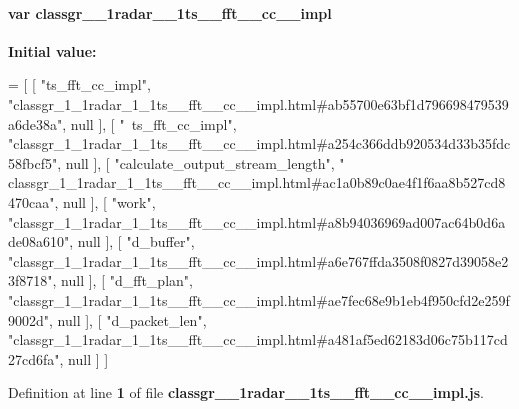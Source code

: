 \paragraph[{classgr\+\_\+1\+\_\+1radar\+\_\+1\+\_\+1ts\+\_\+\+\_\+fft\+\_\+\+\_\+cc\+\_\+\+\_\+impl}]{\setlength{\rightskip}{0pt plus 5cm}var classgr\+\_\+\_\+1radar\+\_\+\_\+1ts\+\_\+\+\_\+fft\+\_\+\+\_\+cc\+\_\+\+\_\+impl}\label{classgr__1__1radar__1__1ts____fft____cc____impl_8js_ab011e260c65eb74fa6d81d3e65b93fee}
{\bfseries Initial value\+:}
\begin{DoxyCode}
=
[
    [ \textcolor{stringliteral}{"ts\_fft\_cc\_impl"}, \textcolor{stringliteral}{"classgr\_1\_1radar\_1\_1ts\_\_fft\_\_cc\_\_impl.html#ab55700e63bf1d796698479539a6de38a"}, 
      null ],
    [ \textcolor{stringliteral}{"~ts\_fft\_cc\_impl"}, \textcolor{stringliteral}{"classgr\_1\_1radar\_1\_1ts\_\_fft\_\_cc\_\_impl.html#a254c366ddb920534d33b35fdc58fbcf5"}, 
      null ],
    [ \textcolor{stringliteral}{"calculate\_output\_stream\_length"}, \textcolor{stringliteral}{"
      classgr\_1\_1radar\_1\_1ts\_\_fft\_\_cc\_\_impl.html#ac1a0b89c0ae4f1f6aa8b527cd8470caa"}, null ],
    [ \textcolor{stringliteral}{"work"}, \textcolor{stringliteral}{"classgr\_1\_1radar\_1\_1ts\_\_fft\_\_cc\_\_impl.html#a8b94036969ad007ac64b0d6ade08a610"}, null ],
    [ \textcolor{stringliteral}{"d\_buffer"}, \textcolor{stringliteral}{"classgr\_1\_1radar\_1\_1ts\_\_fft\_\_cc\_\_impl.html#a6e767ffda3508f0827d39058e23f8718"}, null ],
    [ \textcolor{stringliteral}{"d\_fft\_plan"}, \textcolor{stringliteral}{"classgr\_1\_1radar\_1\_1ts\_\_fft\_\_cc\_\_impl.html#ae7fec68e9b1eb4f950cfd2e259f9002d"}, null ],
    [ \textcolor{stringliteral}{"d\_packet\_len"}, \textcolor{stringliteral}{"classgr\_1\_1radar\_1\_1ts\_\_fft\_\_cc\_\_impl.html#a481af5ed62183d06c75b117cd27cd6fa"}, null 
      ]
]
\end{DoxyCode}


Definition at line {\bf 1} of file {\bf classgr\+\_\+\_\+1radar\+\_\+\_\+1ts\+\_\+\+\_\+fft\+\_\+\+\_\+cc\+\_\+\+\_\+impl.\+js}.

